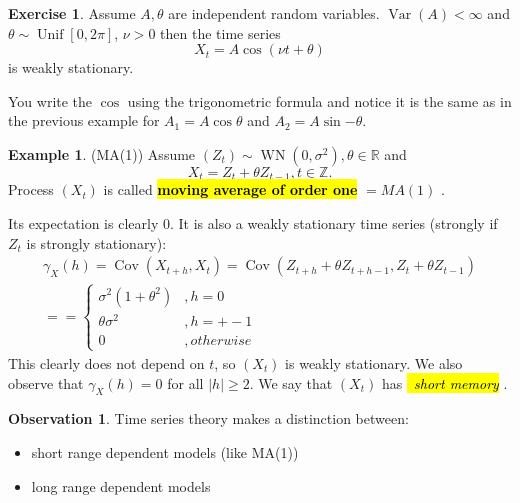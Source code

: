 \documentclass[12pt,a4paper, notitlepage]{book}
\newcommand{\hlc}[2][yellow]{ {\sethlcolor{#1} \hl{#2}} }
\newcommand{\hlcr}[1]{\hlc[lightred]{#1}}
\theoremstyle{definition} %
\newtheorem{example}{Example}[chapter]
\newtheorem{exercise}{Exercise}[chapter]
\newtheorem*{observation}{Observation}
\theoremstyle{plain} %
\newcommand{\R}{\mathbb R}
\newcommand{\Z}{\mathbb Z}
\DeclareMathOperator{\Var}{Var}
\DeclareMathOperator{\Cov}{Cov}
\DeclareMathOperator{\Unif}{Unif}
\DeclareMathOperator{\Wn}{WN}
\newcommand{\New}[1]{ {\bf \hlcr{#1} } }
\newcommand{\Important}[1]{ {\it \hlc{#1} } }
\begin{document}
\begin{exercise}
Assume $A, \theta$ are independent random variables. $\Var(A) < \infty$ and $\theta \sim \Unif[0,2\pi]$, $\nu > 0$ then the time series
\[ X_t = A \cos{( \nu t + \theta )} \] 
 is weakly stationary. 
\end{exercise}
\begin{hint}
You write the $\cos$ using the trigonometric formula and notice it is the same as in the previous example for 
$A_1 = A\cos{\theta}$ and $A_2 = A\sin{ - \theta}$.
\end{hint}

\begin{example} (MA(1))
Assume $(Z_t) \sim \Wn(0, \sigma^2), \theta \in \R$
and 
\[ X_t = Z_t + \theta Z_{t-1},  t \in \Z. \]
Process $(X_t)$ is called \New{ moving average of order one} $= MA(1)$ .

Its expectation is clearly $0$. It is also a weakly stationary time series (strongly if $Z_t$ is strongly stationary):
\begin{align*} \gamma_X(h) =  \Cov(X_{t + h}, X_t) =  \Cov(Z_{t+h} + \theta Z_{t+h-1}, Z_t + \theta Z_{t-1})  \\ = 
= \begin{cases} \sigma^2(1 + \theta^2)  &, h = 0 \\
	\theta \sigma^2	& , h = +-1 \\
		0	& , otherwise \end{cases}
\end{align*}
This clearly does not depend on $t$, so $(X_t)$ is weakly stationary. We also observe that $\gamma_X(h) = 0$ for all $|h| \geq 2$. We say that $(X_t)$ has \Important{\ short memory}.

\end{example}

\begin{observation}
Time series theory makes a distinction between:
\begin{itemize}
\item short range dependent models (like MA(1))
\item long range dependent models
\end{itemize}
\end{observation}
\end{document}
